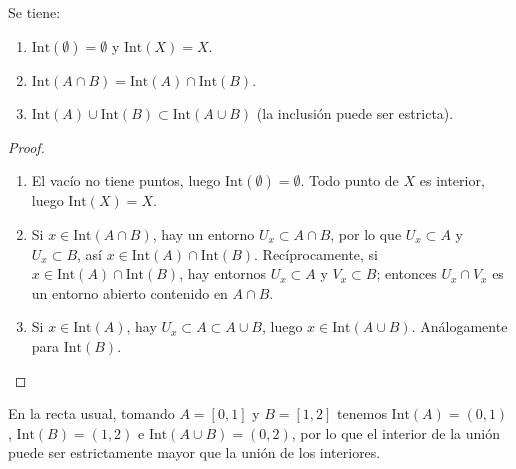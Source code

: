 \begin{proposición}
    Se tiene:
    \begin{enumerate}
        \item $\mathrm{Int}(\emptyset) = \emptyset$ y $\mathrm{Int}(X) = X$.
        \item $\mathrm{Int}(A \cap B) = \mathrm{Int}(A) \cap \mathrm{Int}(B)$.
        \item $\mathrm{Int}(A) \cup \mathrm{Int}(B) \subset \mathrm{Int}(A \cup B)$ (la inclusión puede ser estricta).
    \end{enumerate}
\end{proposición}
\begin{proof}
    \begin{enumerate}
        \item El vacío no tiene puntos, luego $\mathrm{Int}(\emptyset) = \emptyset$. Todo punto de $X$ es interior, luego $\mathrm{Int}(X) = X$.
        \item Si $x \in \mathrm{Int}(A \cap B)$, hay un entorno $U_x \subset A \cap B$, por lo que $U_x \subset A$ y $U_x \subset B$, así $x \in \mathrm{Int}(A) \cap \mathrm{Int}(B)$. Recíprocamente, si $x \in \mathrm{Int}(A) \cap \mathrm{Int}(B)$, hay entornos $U_x \subset A$ y $V_x \subset B$; entonces $U_x \cap V_x$ es un entorno abierto contenido en $A \cap B$.
        \item Si $x \in \mathrm{Int}(A)$, hay $U_x \subset A \subset A \cup B$, luego $x \in \mathrm{Int}(A \cup B)$. Análogamente para $\mathrm{Int}(B)$.
    \end{enumerate}
\end{proof}

\begin{observación}
    En la recta usual, tomando $A = [0,1]$ y $B = [1,2]$ tenemos $\mathrm{Int}(A) = (0,1)$, $\mathrm{Int}(B) = (1,2)$ e $\mathrm{Int}(A \cup B) = (0,2)$, por lo que el interior de la unión puede ser estrictamente mayor que la unión de los interiores.
\end{observación}

